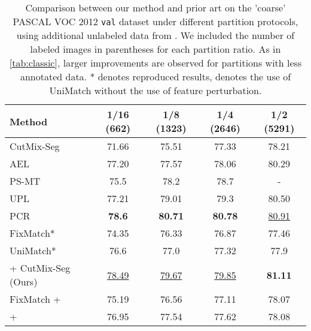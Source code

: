 \documentclass{article}
\renewcommand{\cite}[1]{\citep{#1}}
\begin{document}
\begin{table}\centering
\caption{
Comparison between our method and prior art on the 'coarse' PASCAL VOC 2012 \texttt{val} dataset under different partition protocols, using additional unlabeled data from \cite{sbd}.
We included the number of labeled images in parentheses for each partition ratio. As in \cref{tab:classic}, larger improvements are observed for partitions with less annotated data. * denotes reproduced results,  denotes the use of UniMatch \cite{Yang2022RevisitingWC} without the use of feature perturbation.}
\label{tab:blender}
\begin{tabular}{lcccc}
\toprule
\textbf{Method} & 
\textbf{1/16 (662)} & \textbf{1/8 (1323)} & \textbf{1/4 (2646)} & \textbf{1/2 (5291)} \\
\midrule
CutMix-Seg \cite{french2019semi}& 
71.66 & 75.51 & 77.33 & 78.21  \\
AEL \cite{ael} & 
77.20 & 77.57 & 78.06 & 80.29\\
PS-MT \cite{psmt} &
75.5 & 78.2 & 78.7 & -\\
UPL \cite{wang2022semi} &
77.21 & 79.01 & 79.3 & 80.50\\
PCR \cite{xu2022semisupervised} &
\textbf{78.6} & \textbf{80.71} & \textbf{80.78} & \underline{80.91} \\
FixMatch* \cite{Yang2022RevisitingWC} &
74.35 & 76.33 & 76.87 & 77.46 \\

UniMatch* \cite{Yang2022RevisitingWC} &
76.6 & 77.0 & 77.32 & 77.9 \\


\midrule
\methodname{} + CutMix-Seg (Ours) &
\underline{78.49} &
\underline{79.67}  &
\underline{79.85}  & 
\textbf{81.11} \\

FixMatch + \methodname{} &
75.19  & 
76.56 &
77.11 &
78.07 \\ 

 + \methodname{} &
76.95  &  77.54  & 77.62  & 78.08 \\ 
\bottomrule
\end{tabular}
\end{table}
\end{document}
